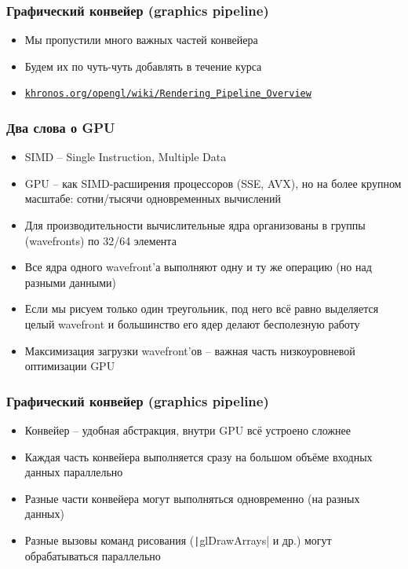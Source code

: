 \documentclass[10pt]{beamer}
\begin{document}
\begin{frame}[fragile]
\frametitle{Графический конвейер (graphics pipeline)}
\begin{itemize}
\item Мы пропустили много важных частей конвейера
\item Будем их по чуть-чуть добавлять в течение курса
\item \href{https://www.khronos.org/opengl/wiki/Rendering_Pipeline_Overview}{\nolinkurl{khronos.org/opengl/wiki/Rendering_Pipeline_Overview}}
\end{itemize}
\end{frame}

\begin{frame}
\frametitle{Два слова о GPU}
\pause
\begin{itemize}
\item SIMD -- Single Instruction, Multiple Data
\pause
\item GPU -- как SIMD-расширения процессоров (SSE, AVX), но на более крупном масштабе: сотни/тысячи одновременных вычислений
\pause
\item Для производительности вычислительные ядра организованы в группы (wavefronts) по 32/64 элемента
\pause
\item Все ядра одного wavefront'а выполняют одну и ту же операцию (но над разными данными)
\pause
\item Если мы рисуем только один треугольник, под него всё равно выделяется целый wavefront и большинство его ядер делают бесполезную работу
\pause
\item Максимизация загрузки wavefront'ов -- важная часть низкоуровневой оптимизации GPU
\end{itemize}
\end{frame}

\begin{frame}
\frametitle{Графический конвейер (graphics pipeline)}
\begin{itemize}
\item Конвейер -- удобная абстракция, внутри GPU всё устроено сложнее
\pause
\item Каждая часть конвейера выполняется сразу на большом объёме входных данных параллельно
\pause
\item Разные части конвейера могут выполняться одновременно (на разных данных)
\pause
\item Разные вызовы команд рисования (\texttt|glDrawArrays| и др.) могут обрабатываться параллельно
\end{itemize}
\end{frame}
\end{document}
